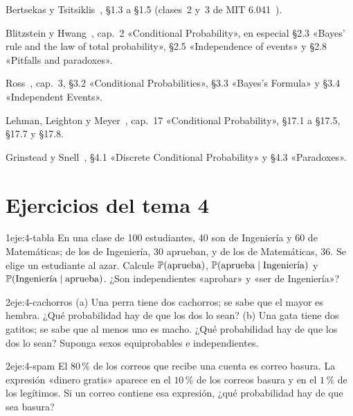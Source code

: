 \begin{lecturas}
\item Bertsekas y Tsitsiklis~\cite{bt}, §1.3 a §1.5 (clases~2 y~3 de MIT 6.041~\cite{mit6041f10}).
\item Blitzstein y Hwang~\cite{bh}, cap.~2 «Conditional Probability», en especial §2.3 «Bayes' rule and the law of total probability», §2.5 «Independence of events» y §2.8 «Pitfalls and paradoxes».
\item Ross~\cite{ross}, cap.~3, §3.2 «Conditional Probabilities», §3.3 «Bayes's Formula» y §3.4 «Independent Events».
\item Lehman, Leighton y Meyer~\cite{mcs}, cap.~17 «Conditional Probability», §17.1 a §17.5, §17.7 y §17.8.
\item Grinstead y Snell~\cite{gs}, §4.1 «Discrete Conditional Probability» y §4.3 «Paradoxes».
\end{lecturas}

\section*{Ejercicios del tema 4}

\begin{ejercicio}{1}{eje:4-tabla}
En una clase de 100 estudiantes, 40 son de Ingeniería y 60 de Matemáticas; de los de Ingeniería, 30 aprueban, y de los de Matemáticas, 36. Se elige un estudiante al azar. Calcule $\mathbb{P}(\text{aprueba})$, $\mathbb{P}(\text{aprueba}\mid\text{Ingeniería})$ y $\mathbb{P}(\text{Ingeniería}\mid\text{aprueba})$. ¿Son independientes «aprobar» y «ser de Ingeniería»?
\end{ejercicio}

\begin{ejercicio}{2}{eje:4-cachorros}
(a) Una perra tiene dos cachorros; se sabe que el mayor es hembra. ¿Qué probabilidad hay de que los dos lo sean? (b) Una gata tiene dos gatitos; se sabe que al menos uno es macho. ¿Qué probabilidad hay de que los dos lo sean? Suponga sexos equiprobables e independientes.
\end{ejercicio}

\begin{ejercicio}{2}{eje:4-spam}
El $80\,\%$ de los correos que recibe una cuenta es correo basura. La expresión «dinero gratis» aparece en el $10\,\%$ de los correos basura y en el $1\,\%$ de los legítimos. Si un correo contiene esa expresión, ¿qué probabilidad hay de que sea basura?
\end{ejercicio}

